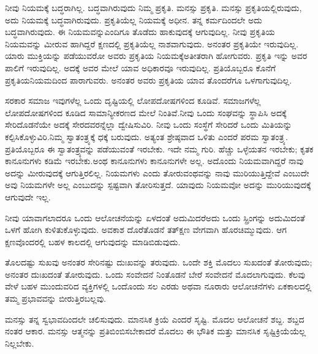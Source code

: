 ನೀವು ನಿಯಮಕ್ಕೆ ಬದ್ಧರಾಗಿಲ್ಲ. ಬದ್ಧವಾಗಿರುವುದು ನಿಮ್ಮ ಪ್ರಕೃತಿ. ಮನಸ್ಸು ಪ್ರಕೃತಿ. ಮನಸ್ಸು ಪ್ರಕೃತಿಯಲ್ಲಿರುವುದು, ಅದು ನಿಯಮಕ್ಕೆ ಬದ್ಧವಾಗಿರುವುದು. ಪ್ರಕೃತಿಯೆಲ್ಲ ನಿಯಮಕ್ಕೆ ಅಧೀನ. ತನ್ನ ಕರ್ಮದಿಂದಲೇ ಅದು ಬದ್ಧವಾಗಿರುವುದು. ಈ ನಿಯಮವನ್ನು\break ಎಂದಿಗೂ ತೊಡೆದು ಹಾಕುವುದಕ್ಕೆ ಆಗುವುದಿಲ್ಲ. ನೀವು ಪ್ರಕೃತಿಯ ನಿಯಮವನ್ನು ಮೀರುವ ಹಾಗಿದ್ದರೆ ಕ್ಷಣದಲ್ಲಿ ಪ್ರಕೃತಿಯೆಲ್ಲ ನಾಶವಾಗುವುದು. ಅನಂತರ ಪ್ರಕೃತಿಯೇ ಇರುವುದಿಲ್ಲ. ಯಾರು ಮುಕ್ತಿಯನ್ನು ಪಡೆಯುವರೋ ಅವರು ಪ್ರಕೃತಿಯ ನಿಯಮಕ್ಕೆ\break ಅತೀತರಾಗಿ ಹೋಗುವರು. ಪ್ರಕೃತಿ ಇನ್ನು ಅವರ ಪಾಲಿಗೆ ಇರುವುದಿಲ್ಲ. ಅದಕ್ಕೆ ಅವರ ಮೇಲೆ ಯಾವ ಅಧಿಕಾರವೂ ಇರುವುದಿಲ್ಲ. ಪ್ರತಿಯೊಬ್ಬರೂ ಕೊನೆಗೆ ಪ್ರಕೃತಿಯ\break ನಿಯಮದಿಂದ ಪಾರಾಗುವರು. ಅನಂತರ ಅವರು ಪ್ರಕೃತಿಯ ಯಾವ ತೊಂದರೆಗೂ ಒಳಗಾಗುವುದಿಲ್ಲ.

ಸರಕಾರ ಸಮಾಜ ಇವುಗಳೆಲ್ಲ ಒಂದು ದೃಷ್ಟಿಯಲ್ಲಿ ಲೋಪದೋಷಗಳಿಂದ ಕೂಡಿವೆ. ಸಮಾಜಗಳೆಲ್ಲ ಲೋಪದೋಷಗಳಿಂದ ಕೂಡಿದ ಸಾಮಾನ್ಯೀಕರಣದ ಮೇಲೆ ನಿಂತಿವೆ.\break ನೀವು ಒಂದು ಸಂಘವನ್ನು ಸ್ಥಾಪಿಸಿ ಅದಕ್ಕೆ ಸೇರಿದೊಡನೆಯೇ ಅದಕ್ಕೆ ಸೇರದವರನ್ನೆಲ್ಲಾ ದ್ವೇಷಿಸುವಿರಿ. ನೀವು ಒಂದು ಸಂಸ್ಥೆಗೆ ಸೇರಿದರೆ ಒಂದು ಮಿತಿಯನ್ನು ಕಲ್ಪಿಸಿಕೊಳ್ಳುವಿರಿ.\break ನಿಮ್ಮ ಸ್ವಾತಂತ್ರ್ಯಕ್ಕೆ ಧಕ್ಕೆ ಬರುವುದು. ಅತ್ಯಂತ ಶ್ರೇಷ್ಠವಾದ ಒಳಿತು ಎಂದರೆ ಪರಮ ಸ್ವಾತಂತ್ರ್ಯ. ಪ್ರತಿಯೊಬ್ಬರೂ ಈ ಸ್ವಾತಂತ್ರ್ಯವನ್ನು ಪಡೆಯುವಂತೆ ಇರಬೇಕು. ಇದೇ ನಮ್ಮ ಗುರಿ. ಹೆಚ್ಚು ಒಳ್ಳೆಯತನ ಇರಬೇಕು; ಕೃತಕ ಕಾನೂನುಗಳು ಕಡಿಮೆ ಇರಬೇಕು.\break ಅಂಥ ಕಾನೂನುಗಳು ಕಾನೂನುಗಳೇ ಅಲ್ಲ. ಅದೊಂದು ನಿಯಮವಾಗಿದ್ದರೆ ನಾವು ಅದನ್ನು ಮೀರುವುದಕ್ಕೆ ಆಗುತ್ತಿರಲಿಲ್ಲ. ನಿಯಮಗಳು ಎಂದು ತೋರುವಂಥವನ್ನು ನಾವು ಮುರಿಯುತ್ತಿದ್ದೇವೆ ಎಂಬುದೇ ಅವು ನಿಯಮಗಳೇ ಅಲ್ಲ ಎಂಬುದನ್ನು ಸ್ಪಷ್ಟವಾಗಿ ತೋರಿಸುತ್ತದೆ. ಯಾವುದು ನಿಯಮವೋ ಅದನ್ನು ಮುರಿಯುವುದಕ್ಕೆ ಆಗುವುದೇ ಇಲ್ಲ.

ನೀವು ಯಾವಾಗಲಾದರೂ ಒಂದು ಆಲೋಚನೆಯನ್ನು ಏಳದಂತೆ ಅದುಮಿದರೆ\break ಅದು ಒಂದು ಸ್ಪ್ರಿಂಗನ್ನು ಅದುಮಿದಂತೆ ಒಳಗೆ ಹೋಗಿ ಕುಳಿತುಕೊಳ್ಳುವುದು. ಅವಕಾಶ ದೊರೆತೊಡನೆ ತತ್​ಕ್ಷಣ ವೇಗವಾಗಿ ಹೊರಚಿಮ್ಮುವುದು. ಆಗ ಕ್ಷಣವೊಂದರಲ್ಲಿ ಬಹಳ ಕಾಲದಲ್ಲಿ ಆಗುವುದನ್ನು ಮಾಡಿಬಿಡುವುದು.

ತೊಲದಷ್ಟು ಸುಖವು ಅನಂತರ ಸೇರಿನಷ್ಟು ದುಃಖವನ್ನು ತರುವುದು. ಒಂದೇ ಶಕ್ತಿ ಮೊದಲು ಸುಖದಂತೆ ತೋರುವುದು; ಅನಂತರ ದುಃಖದಂತೆ ತೋರುವುದು. ಒಂದು ಸಂವೇದನೆ ನಿಂತೊಡನೆ ಬೇರೆ ಸಂವೇದನೆ ಮೊದಲಾಗುವುದು. ಕೆಲವು ವೇಳೆ ಬಹಳ ಮುಂದುವರಿದ ವ್ಯಕ್ತಿಗಳಲ್ಲಿ ಒಂದೊಂದು ಸಲ ಎರಡು ಅಥವಾ ನೂರಾರು ಆಲೋಚನೆಗಳು ಏಕಕಾಲದಲ್ಲಿ ತಮ್ಮ ಪ್ರಭಾವವನ್ನು ಬೀರುತ್ತಿರಬಲ್ಲವು.

ಮನಸ್ಸು ತನ್ನ ಸ್ವಭಾವದಿಂದಲೇ ಚಲಿಸುವುದು. ಮಾನಸಿಕ ಕ್ರಿಯೆ ಎಂದರೆ ಸೃಷ್ಟಿ. ಮೊದಲ ಆಲೋಚನೆ ಶಬ್ದ. ಶಬ್ದದ ನಂತರ ಆಕಾರ. ಮನಸ್ಸು ಆತ್ಮನನ್ನು ಪ್ರತಿಬಿಂಬಿಸಬೇಕಾದರೆ ಮೊದಲು ಈ ಭೌತಿಕ ಮತ್ತು ಮಾನಸಿಕ ಸೃಷ್ಟಿಕ್ರಿಯೆಯೆಲ್ಲ ನಿಲ್ಲಬೇಕು.

